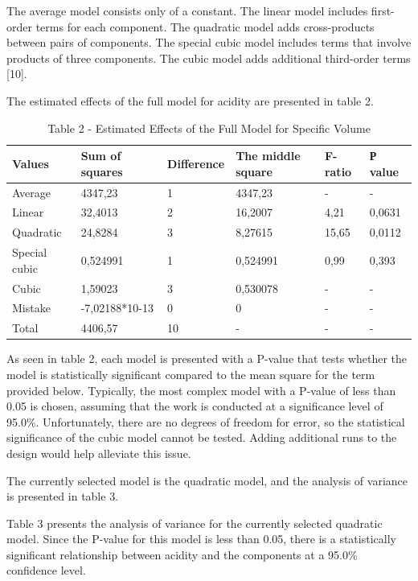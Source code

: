 \begin{multicols}{2}
The average model consists only of a constant. The linear model includes
first-order terms for each component. The quadratic model adds
cross-products between pairs of components. The special cubic model
includes terms that involve products of three components. The cubic
model adds additional third-order terms {[}10{]}.

The estimated effects of the full model for acidity are presented in
table 2.
\end{multicols}

\begin{table}[H]
\caption*{Table 2 - Estimated Effects of the Full Model for Specific Volume}
\centering
\begin{tabular}{|l|l|l|l|l|l|}
\hline
Values        & Sum of squares & Difference & The middle square & F-ratio & Р value \\ \hline
Average       & 4347,23        & 1          & 4347,23           & -       & -       \\ \hline
Linear        & 32,4013        & 2          & 16,2007           & 4,21    & 0,0631  \\ \hline
Quadratic     & 24,8284        & 3          & 8,27615           & 15,65   & 0,0112  \\ \hline
Special cubic & 0,524991       & 1          & 0,524991          & 0,99    & 0,393   \\ \hline
Cubic         & 1,59023        & 3          & 0,530078          & -       & -       \\ \hline
Mistake       & -7,02188*10-13 & 0          & 0                 & -       & -       \\ \hline
Total         & 4406,57        & 10         & -                 & -       & -       \\ \hline
\end{tabular}
\end{table}

\begin{multicols}{2}
As seen in table 2, each model is presented with a P-value that tests
whether the model is statistically significant compared to the mean
square for the term provided below. Typically, the most complex model
with a P-value of less than 0.05 is chosen, assuming that the work is
conducted at a significance level of 95.0\%. Unfortunately, there are no
degrees of freedom for error, so the statistical significance of the
cubic model cannot be tested. Adding additional runs to the design would
help alleviate this issue.

The currently selected model is the quadratic model, and the analysis of
variance is presented in table 3.

Table 3 presents the analysis of variance for the currently selected
quadratic model. Since the P-value for this model is less than 0.05,
there is a statistically significant relationship between acidity and
the components at a 95.0\% confidence level.
\end{multicols}

